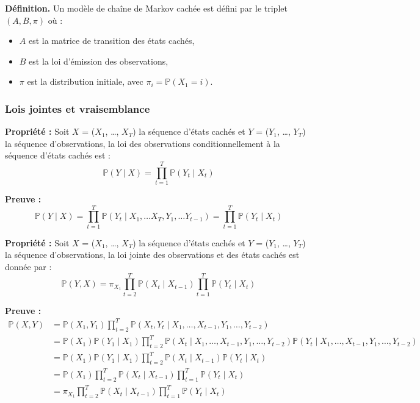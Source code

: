 \documentclass[11pt]{article}
\begin{document}
\vspace{0.3cm}

\textbf{Définition.} 
Un modèle de chaîne de Markov cachée est défini par le triplet $(A, B, \pi)$ où :
\begin{itemize}
    \item $A$ est la matrice de transition des états cachés,
    \item $B$ est la loi d’émission des observations,
    \item $\pi$ est la distribution initiale, avec $\pi_i = \mathbb{P}(X_1 = i)$.
\end{itemize}
\vspace{0.3cm}

\subsubsection{Lois jointes et vraisemblance}

\textbf{Propriété :}
Soit $X$ = ($X_1$, \dots, $X_T$) la séquence d'états cachés et $Y$ = ($Y_1$, \dots, $Y_T$) la séquence d'observations, la loi des observations conditionnellement à la séquence d'états cachés est : 
\[
\mathbb{P}(Y \mid X) = \prod_{t=1}^T \mathbb{P}(Y_t \mid X_t) 
\]

\textbf{Preuve :}
\[
\mathbb{P}(Y \mid X) = \prod_{t=1}^T \mathbb{P}(Y_t \mid X_1, \dots X_T,Y_1, \dots Y_{t-1})=\prod_{t=1}^T \mathbb{P}(Y_t \mid X_t)  
\]
\vspace{0.3cm}

\textbf{Propriété :}
Soit $X$ = ($X_1$, \dots, $X_T$) la séquence d'états cachés et $Y$ = ($Y_1$, \dots, $Y_T$) la séquence d'observations, la loi jointe des observations et des états cachés est donnée par : 
\[
\mathbb{P}(Y, X) = \pi_{X_1} \prod_{t=2}^T \mathbb{P}(X_{t} \mid X_{t-1}) \prod_{t=1}^T \mathbb{P}(Y_t \mid X_t)
\]

\textbf{Preuve :}
\begin{align*}
\mathbb{P}(X, Y) 
&= \mathbb{P}(X_1, Y_1) \prod_{t=2}^T \mathbb{P}(X_t,Y_t \mid X_1, \dots, X_{t-1}, Y_1,\dots, Y_{t-2}) \\
&= \mathbb{P}(X_1)\mathbb{P}(Y_1 \mid X_1) 
\prod_{t=2}^T \mathbb{P}(X_t \mid X_1, \dots, X_{t-1}, Y_1,\dots, Y_{t-2})
\mathbb{P}(Y_t \mid X_1, \dots, X_{t-1}, Y_1,\dots, Y_{t-2}) \\
&= \mathbb{P}(X_1)\mathbb{P}(Y_1 \mid X_1) 
\prod_{t=2}^T \mathbb{P}(X_t \mid X_{t-1}) \mathbb{P}(Y_t \mid X_t) \\
&= \mathbb{P}(X_1) \prod_{t=2}^T \mathbb{P}(X_t \mid X_{t-1}) \prod_{t=1}^T \mathbb{P}(Y_t \mid X_t) \\
&= \pi_{X_1} \prod_{t=2}^T \mathbb{P}(X_t \mid X_{t-1}) \prod_{t=1}^T \mathbb{P}(Y_t \mid X_t)
\end{align*}
\vspace{0.3cm}
\end{document}
